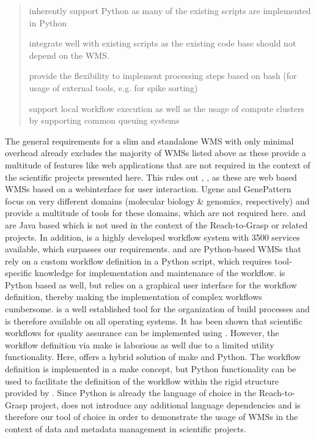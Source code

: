 \begin{quote}
\begin{description}
 \setlength{\itemsep}{5pt}
 \setlength{\parskip}{0pt}
 \setlength{\parsep}{0pt}
 \item[Python] inherently support Python as many of the existing scripts are implemented in Python
 \item[integration] integrate well with existing scripts as the existing code base should not depend on the WMS.
 \item[flexibility] provide the flexibility to implement processing steps based on bash (for usage of external tools, e.g. for spike sorting)
 \item[HPC] support local workflow execution as well as the usage of compute clusters by supporting common queuing systems
\end{description}
\end{quote}

The general requirements for a slim and standalone WMS with only minimal overhead already excludes the majority of WMSs listed above as these provide a multitude of features like web applications that are not required in the context of the scientific projects presented here. This rules out , ,  as these are web based WMSs based on a webinterface for user interaction. Ugene and GenePattern focus on very different domains (molecular biology \& genomics, respectively) and provide a multitude of tools for these domains, which are not required here.  and  are Java based which is not used in the context of the Reach-to-Grasp or related projects.  In addition,  is a highly developed workflow system with 3500 services available, which surpasses our requirements.  and  are Python-based WMSs that rely on a custom workflow definition in a Python script, which requires tool-specific knowledge for implementation and maintenance of the workflow.  is Python based as well, but relies on a graphical user interface for the workflow definition, thereby making the implementation of complex workflows cumbersome.  is a well established tool for the organization of build processes and is therefore available on all operating systems. It has been shown that scientific workflows for quality assurance can be implemented using  \citep{Askren_2016}. However, the workflow definition via make is laborious as well due to a limited utility functionality. Here,  offers a hybrid solution of make and Python. The workflow definition is implemented in a make concept, but Python functionality can be used to facilitate the definition of the workflow within the rigid structure provided by . Since Python is already the language of choice in the Reach-to-Grasp project,  does not introduce any additional language dependencies and is therefore our tool of choice in order to demonstrate the usage of WMSs in the context of data and metadata management in scientific projects.


